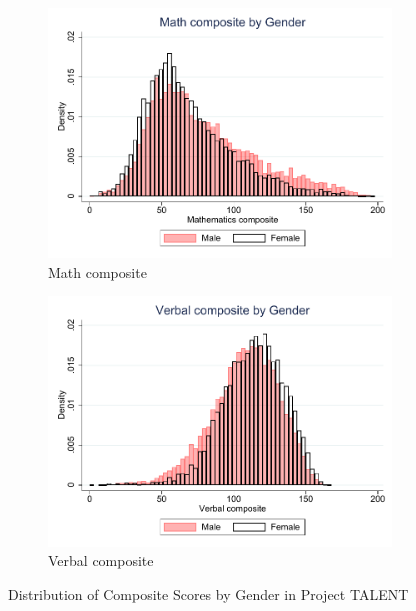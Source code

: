 \documentclass[onehalfspacing,11pt]{article}
\begin{document}
\begin{figure}
	\begin{subfigure}{0.49\textwidth}
		\includegraphics[width=\linewidth]{TALENT_math_by_gender.pdf}
		\caption{Math composite} \label{fig:nlsy79}
	\end{subfigure}
	\hspace*{\fill} %
	\begin{subfigure}{0.49\textwidth}
		\includegraphics[width=\linewidth]{TALENT_verb_by_gender.pdf}
		\caption{Verbal composite} \label{fig:nlsy97bygender}
	\end{subfigure}
	\caption{Distribution of Composite Scores by Gender in Project TALENT} \label{fig:talent_gender}
\end{figure}
\end{document}
